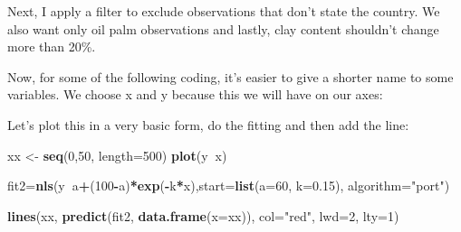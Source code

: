 \documentclass[
]{article}
\newenvironment{Shaded}{\begin{snugshade}}{\end{snugshade}}
\newcommand{\CommentTok}[1]{\textcolor[rgb]{0.56,0.35,0.01}{\textit{#1}}}
\newcommand{\DataTypeTok}[1]{\textcolor[rgb]{0.13,0.29,0.53}{#1}}
\newcommand{\DecValTok}[1]{\textcolor[rgb]{0.00,0.00,0.81}{#1}}
\newcommand{\FloatTok}[1]{\textcolor[rgb]{0.00,0.00,0.81}{#1}}
\newcommand{\KeywordTok}[1]{\textcolor[rgb]{0.13,0.29,0.53}{\textbf{#1}}}
\newcommand{\NormalTok}[1]{#1}
\newcommand{\OperatorTok}[1]{\textcolor[rgb]{0.81,0.36,0.00}{\textbf{#1}}}
\newcommand{\StringTok}[1]{\textcolor[rgb]{0.31,0.60,0.02}{#1}}
\begin{document}
Next, I apply a filter to exclude observations that don't state the
country. We also want only oil palm observations and lastly, clay
content shouldn't change more than 20\%.

\begin{Shaded}
\end{Shaded}

Now, for some of the following coding, it's easier to give a shorter
name to some variables. We choose x and y because this we will have on
our axes:

\begin{Shaded}
\end{Shaded}

Let's plot this in a very basic form, do the fitting and then add the
line:

\begin{Shaded}
\begin{Highlighting}[]
\NormalTok{xx <-}\StringTok{ }\KeywordTok{seq}\NormalTok{(}\DecValTok{0}\NormalTok{,}\DecValTok{50}\NormalTok{, }\DataTypeTok{length=}\DecValTok{500}\NormalTok{)}
\KeywordTok{plot}\NormalTok{(y}\OperatorTok{~}\NormalTok{x)}

\NormalTok{fit2=}\KeywordTok{nls}\NormalTok{(y}\OperatorTok{~}\NormalTok{a}\OperatorTok{+}\NormalTok{(}\DecValTok{100}\OperatorTok{-}\NormalTok{a)}\OperatorTok{*}\KeywordTok{exp}\NormalTok{(}\OperatorTok{-}\NormalTok{k}\OperatorTok{*}\NormalTok{x),}\DataTypeTok{start=}\KeywordTok{list}\NormalTok{(}\DataTypeTok{a=}\DecValTok{60}\NormalTok{, }\DataTypeTok{k=}\FloatTok{0.15}\NormalTok{), }\DataTypeTok{algorithm=}\StringTok{"port"}\NormalTok{)}

\KeywordTok{lines}\NormalTok{(xx, }\KeywordTok{predict}\NormalTok{(fit2, }\KeywordTok{data.frame}\NormalTok{(}\DataTypeTok{x=}\NormalTok{xx)), }\DataTypeTok{col=}\StringTok{"red"}\NormalTok{, }\DataTypeTok{lwd=}\DecValTok{2}\NormalTok{, }\DataTypeTok{lty=}\DecValTok{1}\NormalTok{)}
\end{Highlighting}
\end{Shaded}
\end{document}
